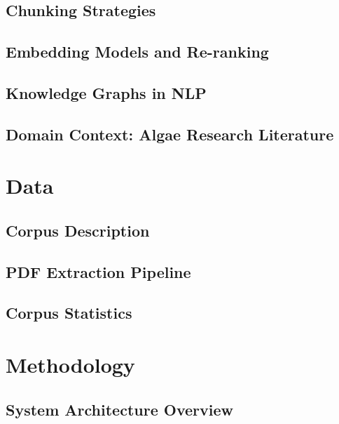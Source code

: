 \documentclass[
  english,
  12pt,
]{report}
\begin{document}
\section{Chunking Strategies}\label{chunking-strategies}

\section{Embedding Models and
Re-ranking}\label{embedding-models-and-re-ranking}

\section{Knowledge Graphs in NLP}\label{knowledge-graphs-in-nlp}

\section{Domain Context: Algae Research
Literature}\label{domain-context-algae-research-literature}

\newpage

\chapter{Data}\label{data}

\section{Corpus Description}\label{corpus-description}

\section{PDF Extraction Pipeline}\label{pdf-extraction-pipeline}

\section{Corpus Statistics}\label{corpus-statistics}

\newpage

\chapter{Methodology}\label{methodology}

\section{System Architecture
Overview}\label{system-architecture-overview}
\end{document}
